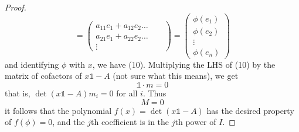 \documentclass[12pt]{article}
\theoremstyle{definition}
\begin{document}
\begin{proof}
\[=
\begin{pmatrix}
a_{11}e_1+a_{12}e_2 \dots\\
a_{21}e_1+a_{22}e_2 \dots\\
\vdots& & 
\end{pmatrix}
=
\begin{pmatrix}
\phi(e_1)\\
\phi(e_2)\\
\vdots\\
\phi(e_n)
\end{pmatrix}
\]
and identifying $\phi$ with $x$, we have (10). Multiplying the LHS of (10) by the matrix of cofactors of $x\mathds{1}-A$ (not sure what this means), we get
\begin{equation}
    [\det (x\mathds{1}-A)]\mathds{1}\cdot m = 0
\end{equation}
that is, $\det (x\mathds{1}-A)m_i =0$ for all $i$. Thus
\begin{equation}
    [\det (x\mathds{1}-A)]M =0
\end{equation}
it follows that the polynomial $f(x) = \det (x\mathds{1}-A)$ has the desired property of $f(\phi) =0$, and the $j$th coefficient is in the $j$th power of $I$.
\end{proof}
\end{document}
